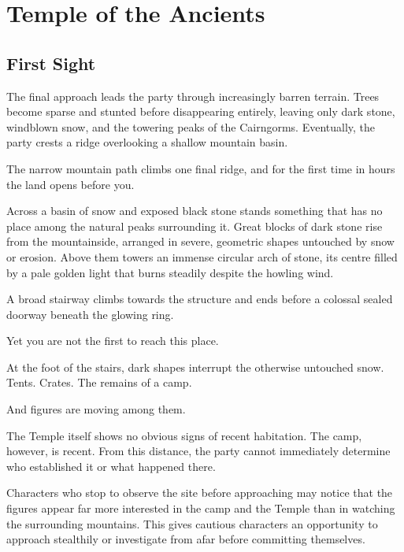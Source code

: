 \chapter*{Temple of the Ancients}

\section*{First Sight}
{\entryfont The final approach leads the party through increasingly barren terrain. Trees become sparse and stunted before disappearing entirely, leaving only dark stone, windblown snow, and the towering peaks of the Cairngorms. Eventually, the party crests a ridge overlooking a shallow mountain basin.}

\begin{DndReadAloud}
	The narrow mountain path climbs one final ridge, and for the first time in hours the land opens before you.

	Across a basin of snow and exposed black stone stands something that has no place among the natural peaks surrounding it. Great blocks of dark stone rise from the mountainside, arranged in severe, geometric shapes untouched by snow or erosion. Above them towers an immense circular arch of stone, its centre filled by a pale golden light that burns steadily despite the howling wind.

	A broad stairway climbs towards the structure and ends before a colossal sealed doorway beneath the glowing ring.

	Yet you are not the first to reach this place.

	At the foot of the stairs, dark shapes interrupt the otherwise untouched snow. Tents. Crates. The remains of a camp.

	And figures are moving among them.
\end{DndReadAloud}

{\noindent\entryfont The Temple itself shows no obvious signs of recent habitation. The camp, however, is recent. From this distance, the party cannot immediately determine who established it or what happened there.

Characters who stop to observe the site before approaching may notice that the figures appear far more interested in the camp and the Temple than in watching the surrounding mountains. This gives cautious characters an opportunity to approach stealthily or investigate from afar before committing themselves.}

